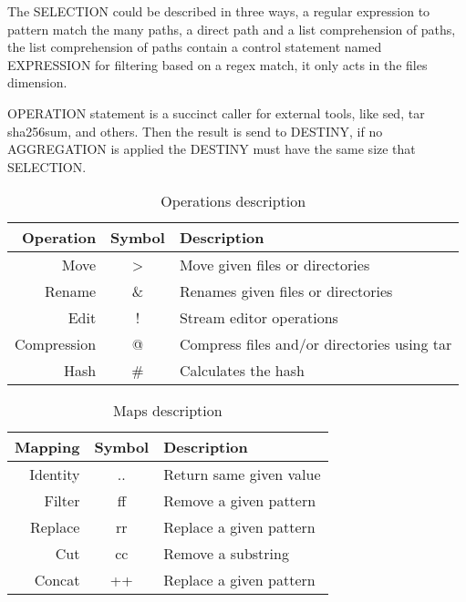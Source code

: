 \documentclass{article}
\begin{document}
The SELECTION could be described in three ways, a regular expression
to pattern match the many paths, a direct path and a list comprehension of
paths, the list comprehension of paths contain a control statement named
EXPRESSION for filtering based on a regex match, it only acts in the files
dimension.

OPERATION statement is a succinct caller for external tools, like sed, tar
sha256sum, and others. Then the result is send to DESTINY, if no AGGREGATION
is applied the DESTINY must have the same size that SELECTION.



\begin{table}[ht]
\centering
\caption{Operations description}
\label{tab:operations}
\begin{tabular}{|r|c|l|}
\hline
Operation   & Symbol & Description\\ \hline
Move        & >      & Move given files or directories \\
Rename      & \&     & Renames given files or directories \\
Edit        & !      & Stream editor operations \\
Compression & @      & Compress files and/or directories using tar \\
Hash        & \#     & Calculates the hash \\
\hline
\end{tabular}
\end{table}

\begin{table}[ht]
\centering
\caption{Maps description}
\label{tab:maps}
\begin{tabular}{|r|c|l|}
\hline
Mapping   & Symbol & Description\\ \hline
Identity  & ..     & Return same given value \\
Filter    & ff     & Remove a given pattern \\
Replace   & rr     & Replace a given pattern \\
Cut       & cc     & Remove a substring \\
Concat    & ++     & Replace a given pattern \\
\hline
\end{tabular}
\end{table}



\end{document}
